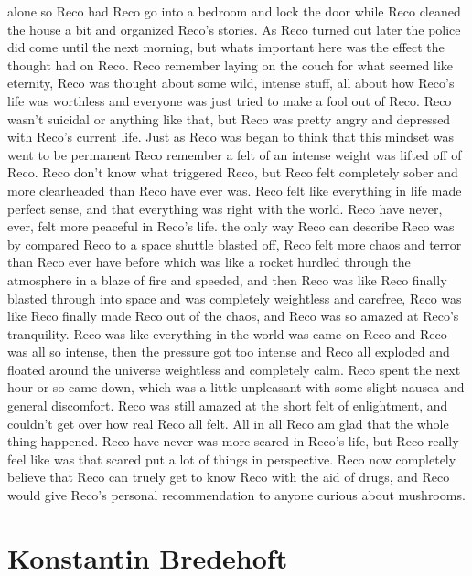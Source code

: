 \documentclass[12pt]{book}
\begin{document}
alone so Reco had Reco go into a bedroom and lock the door while Reco cleaned the house a bit and organized Reco's stories. As Reco turned out later the police did come until the next morning, but whats important here was the effect the thought had on Reco. Reco remember laying on the couch for what seemed like eternity, Reco was thought about some wild, intense stuff, all about how Reco's life was worthless and everyone was just tried to make a fool out of Reco. Reco wasn't suicidal or anything like that, but Reco was pretty angry and depressed with Reco's current life. Just as Reco was began to think that this mindset was went to be permanent Reco remember a felt of an intense weight was lifted off of Reco. Reco don't know what triggered Reco, but Reco felt completely sober and more clearheaded than Reco have ever was. Reco felt like everything in life made perfect sense, and that everything was right with the world. Reco have never, ever, felt more peaceful in Reco's life. the only way Reco can describe Reco was by compared Reco to a space shuttle blasted off, Reco felt more chaos and terror than Reco ever have before which was like a rocket hurdled through the atmosphere in a blaze of fire and speeded, and then Reco was like Reco finally blasted through into space and was completely weightless and carefree, Reco was like Reco finally made Reco out of the chaos, and Reco was so amazed at Reco's tranquility. Reco was like everything in the world was came on Reco and Reco was all so intense, then the pressure got too intense and Reco all exploded and floated around the universe weightless and completely calm. Reco spent the next hour or so came down, which was a little unpleasant with some slight nausea and general discomfort. Reco was still amazed at the short felt of enlightment, and couldn't get over how real Reco all felt. All in all Reco am glad that the whole thing happened. Reco have never was more scared in Reco's life, but Reco really feel like was that scared put a lot of things in perspective. Reco now completely believe that Reco can truely get to know Reco with the aid of drugs, and Reco would give Reco's personal recommendation to anyone curious about mushrooms.



\chapter{Konstantin Bredehoft}
\end{document}
